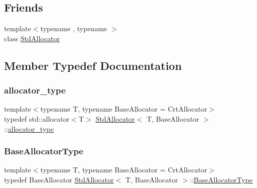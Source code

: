 \subsection*{Friends}
\begin{DoxyCompactItemize}
\item 
{\footnotesize template$<$typename , typename $>$ }\\class \hyperlink{classStdAllocator_afb3a6a655f835f6b9ec21fab41291287}{Std\+Allocator}
\end{DoxyCompactItemize}


\subsection{Member Typedef Documentation}
\mbox{\label{classStdAllocator_a572b0281d5b161135a426d3ff348d997}} 
\subsubsection{\texorpdfstring{allocator\+\_\+type}{allocator\_type}}
{\footnotesize\ttfamily template$<$typename T, typename Base\+Allocator = Crt\+Allocator$>$ \\
typedef std\+::allocator$<$T$>$ \hyperlink{classStdAllocator}{Std\+Allocator}$<$ T, Base\+Allocator $>$\+::\hyperlink{classStdAllocator_a572b0281d5b161135a426d3ff348d997}{allocator\+\_\+type}\hspace{0.3cm}{\ttfamily [private]}}

\mbox{\label{classStdAllocator_a09e7299a6c14e2d234bd469f1162bb21}} 
\subsubsection{\texorpdfstring{Base\+Allocator\+Type}{BaseAllocatorType}}
{\footnotesize\ttfamily template$<$typename T, typename Base\+Allocator = Crt\+Allocator$>$ \\
typedef Base\+Allocator \hyperlink{classStdAllocator}{Std\+Allocator}$<$ T, Base\+Allocator $>$\+::\hyperlink{classStdAllocator_a09e7299a6c14e2d234bd469f1162bb21}{Base\+Allocator\+Type}}

